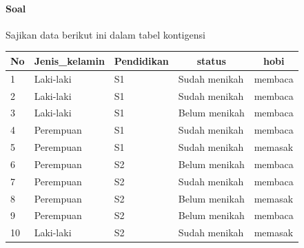 \documentclass[a4paper,12pt]{article}
\begin{document}
\paragraph{Soal\\}
Sajikan data berikut ini dalam tabel kontigensi
\begin{table}[!ht]
	\begin{tabular}{|l|l|l|l|l|}
		\hline
		No & Jenis\_kelamin & \multicolumn{1}{c|}{Pendidikan} & \multicolumn{1}{c|}{status} & \multicolumn{1}{c|}{hobi} \\ \hline
		1  & Laki-laki      & S1                              & Sudah menikah               & membaca                   \\ \hline
		2  & Laki-laki      & S1                              & Sudah menikah               & membaca                   \\ \hline
		3  & Laki-laki      & S1                              & Belum menikah               & membaca                   \\ \hline
		4  & Perempuan      & S1                              & Sudah menikah               & membaca                   \\ \hline
		5  & Perempuan      & S1                              & Sudah menikah               & memasak                   \\ \hline
		6  & Perempuan      & S2                              & Belum menikah               & membaca                   \\ \hline
		7  & Perempuan      & S2                              & Sudah menikah               & membaca                   \\ \hline
		8  & Perempuan      & S2                              & Belum menikah               & memasak                   \\ \hline
		9  & Perempuan      & S2                              & Belum menikah               & membaca                   \\ \hline
		10 & Laki-laki      & S2                              & Sudah menikah               & memasak                   \\ \hline
	\end{tabular}
\end{table}
\end{document}
